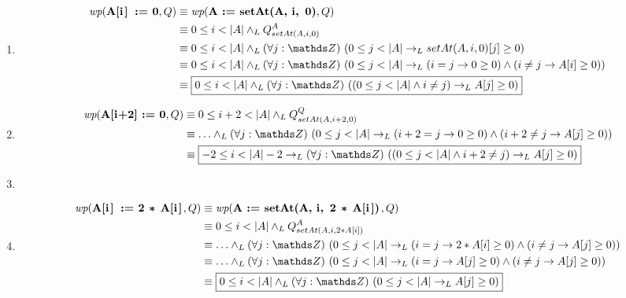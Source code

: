 \begin{enumerate}[label=\alph*)]
    \item \begin{align*}
              \wp{A[i] := 0}{Q} & \equiv \wp{A := setAt(A, i, 0)}{Q}                                                                                                    \\
                                & \equiv 0 \leq i < |A| \yLuego Q_{setAt(A, i, 0)}^A                                                                                    \\
                                & \equiv 0 \leq i < |A| \yLuego \paraTodo{j}{\ent}{0 \leq j < |A| \thenLuego setAt(A, i, 0)[j] \geq 0}                                  \\
                                & \equiv 0 \leq i < |A| \yLuego \paraTodo{j}{\ent}{0 \leq j < |A| \thenLuego (i = j \Then 0 \geq 0) \land (i \neq j \Then A[i] \geq 0)} \\
                                & \equiv \boxed{0 \leq i < |A| \yLuego \paraTodo{j}{\ent}{(0 \leq j < |A| \land i \neq j) \thenLuego A[j] \geq 0}}
          \end{align*}

    \item \begin{align*}
              \wp{A[i+2] := 0}{Q} & \equiv 0 \leq i+2 < |A| \yLuego Q_{setAt(A, i+2, 0)}^Q                                                                            \\
                                  & \equiv \ldots \yLuego \paraTodo{j}{\ent}{0 \leq j < |A| \thenLuego (i+2 = j \Then 0 \geq 0) \land (i+2 \neq j \Then A[j] \geq 0)} \\
                                  & \equiv \boxed{-2 \leq i < |A| - 2 \thenLuego \paraTodo{j}{\ent}{(0 \leq j < |A| \land i+2 \neq j) \thenLuego A[j] \geq 0}}
          \end{align*}

    \item \hacer

    \item \begin{align*}
              \wp{A[i] := 2 * A[i]}{Q} & \equiv \wp{A := setAt(A, i, 2 * A[i])}{Q}                                                                                            \\
                                       & \equiv 0 \leq i < |A| \yLuego Q_{setAt(A, i, 2 * A[i])}^A                                                                            \\
                                       & \equiv \ldots \yLuego \paraTodo{j}{\ent}{0 \leq j < |A| \thenLuego (i = j \Then 2 * A[i] \geq 0) \land (i \neq j \Then A[j] \geq 0)} \\
                                       & \equiv \ldots \yLuego \paraTodo{j}{\ent}{0 \leq j < |A| \thenLuego (i = j \Then A[j] \geq 0) \land (i \neq j \Then A[j] \geq 0)}     \\
                                       & \equiv \boxed{0 \leq i < |A| \yLuego \paraTodo{j}{\ent}{0 \leq j < |A| \thenLuego A[j] \geq 0}}
          \end{align*}


\end{enumerate}
